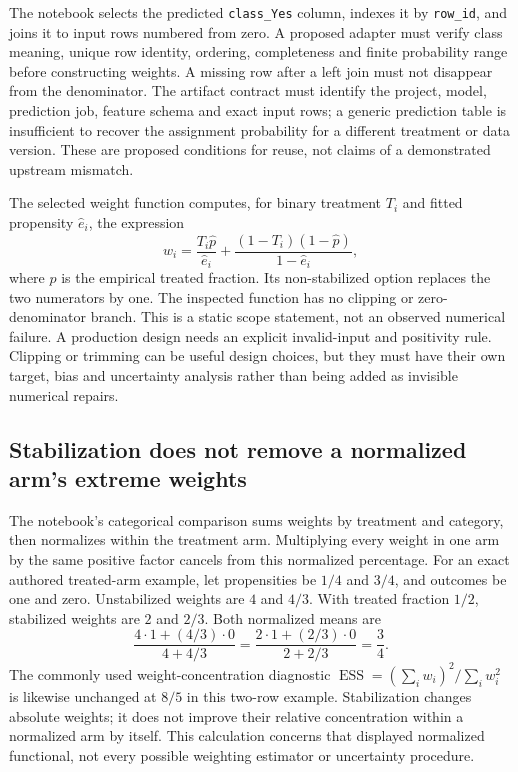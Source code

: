 The notebook selects the predicted \texttt{class\_Yes} column, indexes it by
\texttt{row\_id}, and joins it to input rows numbered from zero. A proposed
adapter must verify class meaning, unique row identity, ordering, completeness
and finite probability range before constructing weights. A missing row after
a left join must not disappear from the denominator. The artifact contract
must identify the project, model, prediction job, feature schema and exact
input rows; a generic prediction table is insufficient to recover the
assignment probability for a different treatment or data version. These are
proposed conditions for reuse, not claims of a demonstrated upstream mismatch.
\citep{exec25_datarobot_notebook,exec25_datarobot_choice}

The selected weight function computes, for binary treatment $T_i$ and fitted
propensity $\widehat e_i$, the expression
\begin{equation}
 w_i=\frac{T_i\widehat p}{\widehat e_i}
       +\frac{(1-T_i)(1-\widehat p)}{1-\widehat e_i},
\end{equation}
where $\widehat p$ is the empirical treated fraction. Its non-stabilized option
replaces the two numerators by one. The inspected function has no clipping or
zero-denominator branch. This is a static scope statement, not an observed
numerical failure. A production design needs an explicit invalid-input and
positivity rule. Clipping or trimming can be useful design choices, but they
must have their own target, bias and uncertainty analysis rather than being
added as invisible numerical repairs.~\citep{exec25_datarobot_notebook,exec25_datarobot_choice}

\subsection{Stabilization does not remove a normalized arm's extreme weights}
The notebook's categorical comparison sums weights by treatment and category,
then normalizes within the treatment arm. Multiplying every weight in one arm
by the same positive factor cancels from this normalized percentage. For an
exact authored treated-arm example, let propensities be $1/4$ and $3/4$, and
outcomes be one and zero. Unstabilized weights are $4$ and $4/3$. With treated
fraction $1/2$, stabilized weights are $2$ and $2/3$. Both normalized means are
\begin{equation}
 \frac{4\cdot1+(4/3)\cdot0}{4+4/3}
 =\frac{2\cdot1+(2/3)\cdot0}{2+2/3}=\frac34.
\end{equation}
The commonly used weight-concentration diagnostic
$\operatorname{ESS}=(\sum_i w_i)^2/\sum_i w_i^2$ is likewise unchanged at
$8/5$ in this two-row example. Stabilization changes absolute weights; it does
not improve their relative concentration within a normalized arm by itself.
This calculation concerns that displayed normalized functional, not every
possible weighting estimator or uncertainty procedure.~\citep{exec25_datarobot_notebook,exec25_datarobot_choice}


